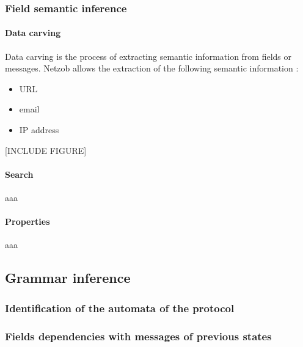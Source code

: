 \documentclass[letterpaper,10pt,english]{sphinxmanual}
\begin{document}
\subsubsection{Field semantic inference}
\label{modelization/vocabular:field-semantic-inference}

\paragraph{Data carving}
\label{modelization/vocabular:data-carving}
Data carving is the process of extracting semantic information from fields or messages. Netzob allows the extraction of the following semantic information :
\begin{itemize}
\item {} 
URL

\item {} 
email

\item {} 
IP address

\end{itemize}

{[}INCLUDE FIGURE{]}


\paragraph{Search}
\label{modelization/vocabular:search}
aaa


\paragraph{Properties}
\label{modelization/vocabular:properties}
aaa


\subsection{Grammar inference}
\label{modelization/grammar:grammar-inference}\label{modelization/grammar:grammar}\label{modelization/grammar::doc}

\subsubsection{Identification of the automata of the protocol}
\label{modelization/grammar:identification-of-the-automata-of-the-protocol}

\subsubsection{Fields dependencies with messages of previous states}
\label{modelization/grammar:fields-dependencies-with-messages-of-previous-states}
\end{document}
